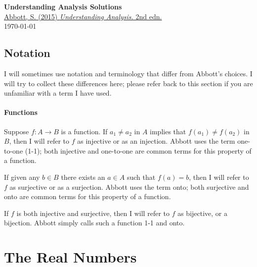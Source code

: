 \documentclass{lew98_solutions}
\begin{document}
\begin{titlepage}
    \begin{center}
        {\bfseries \huge Understanding Analysis Solutions} \\[2mm]
        \href{https://link.springer.com/book/10.1007/978-1-4939-2712-8}{Abbott, S. (2015) \textit{Understanding Analysis.} 2nd edn.} \\[4mm]
        \today
    \end{center}

    {\let\clearpage\relax \tableofcontents}
    \thispagestyle{empty}
\end{titlepage}

\hypertarget{notation}{}

\section*{Notation}

I will sometimes use notation and terminology that differ from Abbott's choices. I will try to collect these differences here; please refer back to this section if you are unfamiliar with a term I have used.

\subsubsection*{Functions}

Suppose \( f : A \to B \) is a function. If \( a_1 \neq a_2 \) in \( A \) implies that \( f(a_1) \neq f(a_2) \) in \( B \), then I will refer to \( f \) as injective or as an injection. Abbott uses the term one-to-one (1-1); both injective and one-to-one are common terms for this property of a function. 

If given any \( b \in B \) there exists an \( a \in A \) such that \( f(a) = b \), then I will refer to \( f \) as surjective or as a surjection. Abbott uses the term onto; both surjective and onto are common terms for this property of a function.

If \( f \) is both injective and surjective, then I will refer to \( f \) as bijective, or a bijection. Abbott simply calls such a function 1-1 and onto.

\thispagestyle{plain}

\chapter{The Real Numbers}
\label{chap:1}
\end{document}
